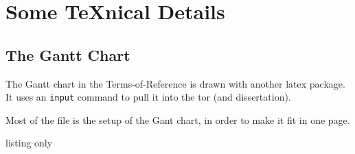 
\chapter{Some TeXnical Details}

\section{The Gantt Chart}
The Gantt chart in the Terms-of-Reference is drawn with another latex package.
It uses an \texttt{input} command to pull it into the tor (and dissertation).

Most of the file  is the setup of the Gant chart, in order to make it fit in one page.


\begin{tcblisting}{listing only}
%
\end{tcblisting}
